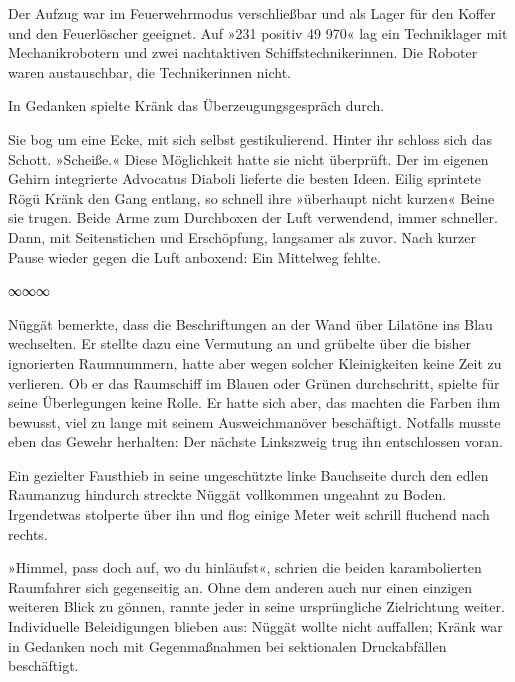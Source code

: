 Der Aufzug war im Feuerwehrmodus verschließbar und als Lager für den Koffer und den Feuerlöscher geeignet. Auf »231 positiv 49 970« lag ein Techniklager mit Mechanikrobotern und zwei nachtaktiven Schiffstechnikerinnen. Die Roboter waren austauschbar, die Technikerinnen nicht.

In Gedanken spielte Kränk das Überzeugungsgespräch durch. 

Sie bog um eine Ecke, mit sich selbst gestikulierend.  Hinter ihr schloss sich das Schott. »Scheiße.« Diese Möglichkeit hatte sie nicht überprüft. Der im eigenen Gehirn integrierte Advocatus Diaboli lieferte die besten Ideen. Eilig sprintete Rögü Kränk den Gang entlang, so schnell ihre »überhaupt nicht kurzen« Beine sie trugen. Beide Arme zum Durchboxen der Luft verwendend, immer schneller. Dann, mit Seitenstichen und Erschöpfung, langsamer als zuvor. Nach kurzer Pause wieder gegen die Luft anboxend: Ein Mittelweg fehlte.

\begin{center}
	∞∞∞
\end{center}

Nüggät bemerkte, dass die Beschriftungen an der Wand über Lilatöne ins Blau wechselten. Er stellte dazu eine Vermutung an und grübelte über die bisher ignorierten Raumnummern, hatte aber wegen solcher Kleinigkeiten keine Zeit zu verlieren. Ob er das Raumschiff im Blauen oder Grünen durchschritt, spielte für seine Überlegungen keine Rolle. Er hatte sich aber, das machten die Farben ihm bewusst, viel zu lange mit seinem Ausweichmanöver beschäftigt. Notfalls musste eben das Gewehr herhalten: Der nächste Linkszweig trug ihn entschlossen voran.

Ein gezielter Fausthieb in seine ungeschützte linke Bauchseite durch den edlen Raumanzug hindurch streckte Nüggät vollkommen ungeahnt zu Boden. Irgendetwas stolperte über ihn und flog einige Meter weit schrill fluchend nach rechts.

»Himmel, pass doch auf, wo du hinläufst«, schrien die beiden karambolierten Raumfahrer sich gegenseitig an. Ohne dem anderen auch nur einen einzigen weiteren Blick zu gönnen, rannte jeder in seine ursprüngliche Zielrichtung weiter. Individuelle Beleidigungen blieben aus: Nüggät wollte nicht auffallen; Kränk war in Gedanken noch mit Gegenmaßnahmen bei sektionalen Druckabfällen beschäftigt.

